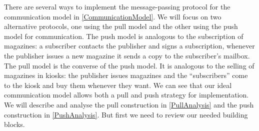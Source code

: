 There are several ways to implement the message-passing protocol for the 
communication model in \cref{CommunicationModel}.
We will focus on two alternative protocols, one using the pull model and the 
other using the push model for communication.
The push model is analogous to the subscription of magazines:
a subscriber contacts the publisher and signs a subscription, whenever the 
publisher issues a new magazine it sends a copy to the subscriber's mailbox.
The pull model is the converse of the push model.
It is analogous to the selling of magazines in kiosks:
the publisher issues magazines and the \enquote{subscribers} come to the kiosk 
and buy them whenever they want.
We can see that our ideal communication model allows both a pull and push 
strategy for implementation.
We will describe and analyse the pull construction in \cref{PullAnalysis} and 
the push construction in \cref{PushAnalysis}.
But first we need to review our needed building blocks.
